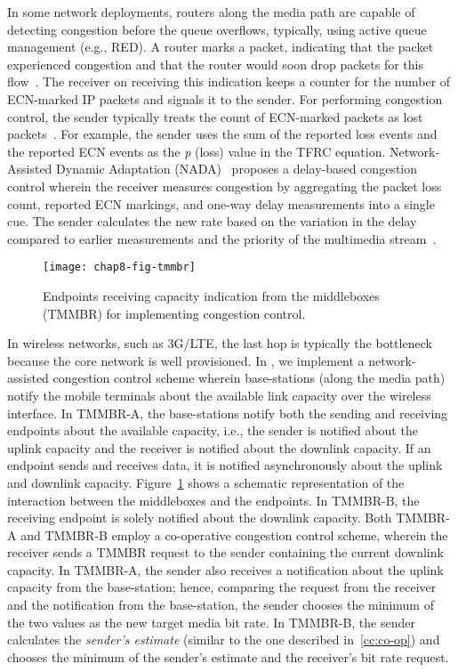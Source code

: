 
In some network deployments, routers along the media path are capable of
detecting congestion before the queue overflows, typically, using active queue
management (e.g., RED). A router marks a packet, indicating that the packet
experienced congestion and that the router would soon drop packets for this
flow~\cite{rfc3168}. The receiver on receiving this indication keeps a counter
for the number of ECN-marked IP packets and signals it to the sender. For
performing congestion control, the sender typically treats the count of
ECN-marked packets as lost packets~\cite{rfc6679}. For example, the sender uses
the sum of the reported loss events and the reported ECN events as the
\emph{p} (loss) value in the TFRC equation. Network-Assisted Dynamic
Adaptation (NADA)~\cite{rmcat-nada} proposes a delay-based congestion control
wherein the receiver measures congestion by aggregating the packet loss count,
reported ECN markings, and one-way delay measurements into a single cue. The
sender calculates the new rate based on the variation in the delay compared
to earlier measurements and the priority of the multimedia stream~\cite{pv-nada}.

\begin{figure}[!t]
\texttt{[image: chap8-fig-tmmbr]}
  \caption{Endpoints receiving capacity indication from the middleboxes
  (TMMBR) for implementing congestion control.}
\label{fig:cc:tmmbrab}
\end{figure}

In wireless networks, such as 3G/LTE, the last hop is typically the bottleneck
because the core network is well provisioned. In , we
implement a network-assisted congestion control scheme wherein base-stations
(along the media path) notify the mobile terminals about the available link
capacity over the wireless interface.
In TMMBR-A, the base-stations notify both the sending and receiving
endpoints about the available capacity, i.e., the sender is notified about the
uplink capacity and the receiver is notified about the downlink capacity. If
an endpoint sends and receives data, it is notified asynchronously about the
uplink and downlink capacity. Figure~\ref{fig:cc:tmmbrab} shows a schematic
representation of the interaction between the middleboxes and the
endpoints. In TMMBR-B, the receiving endpoint is solely notified about the
downlink capacity. Both TMMBR-A and TMMBR-B employ a co-operative congestion
control scheme, wherein the receiver sends a TMMBR request to the sender
containing the current downlink capacity. In TMMBR-A, the sender also receives
a notification about the uplink capacity from the base-station; hence,
comparing the request from the receiver and the notification from the base-station,
the sender chooses the minimum of the two values as the new target media bit rate. In
TMMBR-B, the sender calculates the \emph{sender's estimate} (similar to the
one described in~\ref{cc:co-op}) and chooses the minimum of the sender's
estimate and the receiver's bit rate request.


